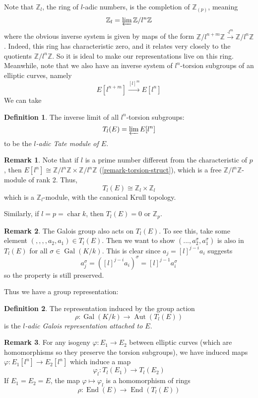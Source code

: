 \documentclass[12pt]{article}
\theoremstyle{remark}
\theoremstyle{definition}
\newtheorem{remark}{Remark}[subsection]
\newtheorem{definition}{Definition}[subsection]
\newcommand{\s}[0]{\sigma}
\newcommand{\Z}[0]{\mathbb{Z}}
\newcommand{\Aut}[0]{\operatorname{Aut}}
\newcommand{\Gal}[0]{\operatorname{Gal}}
\newcommand{\End}[0]{\operatorname{End}}
\begin{document}
            Note that $\Z_l$, the ring of $l$-adic numbers, is the completion of $\Z_{(p)}$, meaning
            \[\Z_l=\varprojlim\Z/l^n\Z\]
            where the obvious inverse system is given by maps of the form $\Z/l^{n+m}\Z\xrightarrow{\cdot l^m}\Z/l^n\Z$. Indeed, this ring has characteristic zero, and it relates very closely to the quotients $\Z/l^n\Z$. So it is ideal to make our representations live on this ring.  Meanwhile, note that we also have an inverse system of $l^n$-torsion subgroups of an elliptic curves, namely
            \[E[l^{n+m}]\xrightarrow{[l]^m}E[l^n]\]
            We can take 
            \begin{definition}
                The inverse limit of all $l^n$-torsion subgroups:
                \[T_l(E)=\varprojlim E[l^n]\]
                to be the \textit{$l$-adic Tate module of $E$}.
            \end{definition}
            \begin{remark}
                Note that if $l$ is a prime number different from the characteristic of $p$, then $E[l^n]\cong \Z/l^n\Z\times\Z/l^n\Z$ (\autoref{remark-torsion-struct}), which is a free $\Z/l^n\Z$-module of rank 2. Thus,
                \[T_l(E)\cong \Z_l\times\Z_l\]
                which is a $\Z_l$-module, with the canonical Krull topology.
                
                Similarly, if $l=p=\operatorname{char}k$, then $T_l(E)=0$ or $\Z_p$.
            \end{remark}
            \begin{remark}
                The Galois group also acts on $T_l(E)$. To see this, take some element $(,,,,a_2,a_1)\in T_l(E)$. Then we want to show $(...,a_2^\s,a_1^\s)$ is also in $T_l(E)$ for all $\s\in\Gal(K/k)$. This is clear since $a_j=[l]^{j-i}a_i$ suggests
                \[a_j^\s=([l]^{j-i}a_i)^\s=[l]^{j-1}a_i^\s\]
                so the property is still preserved.
            \end{remark}
            Thus we have a group representation:
            \begin{definition}
                The representation induced by the group action
                \[\rho:\Gal(K/k)\to \Aut(T_l(E))\]
                is the \textit{$l$-adic Galois representation attached to $E$}.
            \end{definition}
            \begin{remark}
                For any isogeny $\varphi:E_1\to E_2$ between elliptic curves (which are homomorphisms so they preserve the torsion subgroups), we have induced maps $\varphi:E_1[l^n]\to E_2[l^n]$ which induce a map
                \[\varphi_l:T_l(E_1)\to T_l(E_2)\]
                If $E_1=E_2=E$, the map $\varphi\mapsto\varphi_l$ is a homomorphism of rings
                \[\rho:\End(E)\to\End(T_l(E))\]
            \end{remark}
\end{document}
